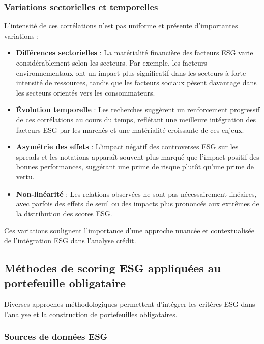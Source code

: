 \subsubsection{Variations sectorielles et temporelles}

L'intensité de ces corrélations n'est pas uniforme et présente d'importantes variations :

\begin{itemize}
    \item \textbf{Différences sectorielles} : La matérialité financière des facteurs ESG varie considérablement selon les secteurs. Par exemple, les facteurs environnementaux ont un impact plus significatif dans les secteurs à forte intensité de ressources, tandis que les facteurs sociaux pèsent davantage dans les secteurs orientés vers les consommateurs.
    
    \item \textbf{Évolution temporelle} : Les recherches suggèrent un renforcement progressif de ces corrélations au cours du temps, reflétant une meilleure intégration des facteurs ESG par les marchés et une matérialité croissante de ces enjeux.
    
    \item \textbf{Asymétrie des effets} : L'impact négatif des controverses ESG sur les spreads et les notations apparaît souvent plus marqué que l'impact positif des bonnes performances, suggérant une prime de risque plutôt qu'une prime de vertu.
    
    \item \textbf{Non-linéarité} : Les relations observées ne sont pas nécessairement linéaires, avec parfois des effets de seuil ou des impacts plus prononcés aux extrêmes de la distribution des scores ESG.
\end{itemize}

Ces variations soulignent l'importance d'une approche nuancée et contextualisée de l'intégration ESG dans l'analyse crédit.

\subsection{Méthodes de scoring ESG appliquées au portefeuille obligataire}

Diverses approches méthodologiques permettent d'intégrer les critères ESG dans l'analyse et la construction de portefeuilles obligataires.

\subsubsection{Sources de données ESG}

